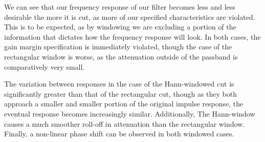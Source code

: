 \documentclass[journal]{IEEEtran}
\begin{document}
We can see that our frequency response of our filter becomes less and less desirable the more it is cut, as more of our specified characteristics are violated. This is to be expected, as by windowing we are excluding a portion of the information that dictates how the frequency response will look. In both cases, the gain margin specification is immediately violated, though the case of the rectangular window is worse, as the attenuation outside of the passband is comparatively very small. 

The variation between responses in the case of the Hann-windowed cut is significantly greater than that of the rectangular cut, though as they both approach a smaller and smaller portion of the original impulse response, the eventual response becomes increasingly similar. Additionally, The Hann-window causes a much smoother roll-off in attenuation than the rectangular window. Finally, a non-linear phase shift can be observed in both windowed cases.
\end{document}
